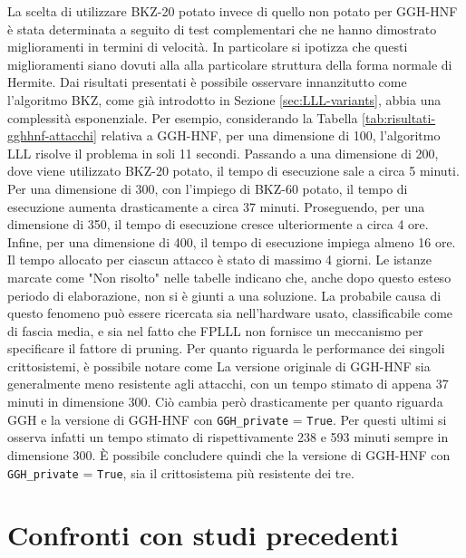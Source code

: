 La scelta di utilizzare BKZ-20 potato invece di quello non potato per GGH-HNF è stata 
determinata a seguito di test complementari che ne hanno dimostrato miglioramenti in 
termini di velocità. In particolare si ipotizza che questi miglioramenti siano dovuti
alla alla particolare struttura della forma normale di Hermite.
Dai risultati presentati è possibile osservare innanzitutto come l'algoritmo BKZ,
come già introdotto in Sezione \ref{sec:LLL-variants}, abbia una complessità esponenziale.
Per esempio, considerando la Tabella \ref{tab:risultati-gghhnf-attacchi} relativa a GGH-HNF, 
per una dimensione di 100, l'algoritmo 
LLL risolve il problema in 
soli 11 secondi. Passando a una dimensione di 200, dove viene utilizzato 
BKZ-20 potato, il tempo di esecuzione sale a circa 5 minuti. Per una dimensione di 300, 
con l'impiego di BKZ-60 potato, il tempo di esecuzione aumenta drasticamente a circa 37 minuti. 
Proseguendo, per una dimensione di 350, il tempo di esecuzione cresce ulteriormente a circa 
4 ore. Infine, per una dimensione di 400, il tempo di esecuzione impiega almeno 16 ore.
Il tempo allocato per ciascun attacco è stato di massimo 4 giorni.
Le istanze marcate come "Non risolto" nelle tabelle 
indicano che, anche dopo questo esteso periodo di elaborazione, non si è giunti a una soluzione. 
La probabile causa di questo fenomeno può essere ricercata sia nell'hardware usato, classificabile
come di fascia media, e sia nel fatto che FPLLL non fornisce un meccanismo per specificare 
il fattore di pruning.
Per quanto riguarda le performance dei singoli crittosistemi, è possibile notare come La
versione originale di GGH-HNF sia generalmente meno resistente agli attacchi, con un tempo stimato di 
appena 37 minuti in dimensione 300. Ciò cambia però drasticamente per quanto riguarda
GGH e la versione di GGH-HNF con \texttt{GGH\_private} = \texttt{True}. Per questi ultimi
si osserva infatti un tempo stimato di rispettivamente 238 e 593 minuti sempre in dimensione
300. È possibile concludere quindi che la versione di GGH-HNF con 
\texttt{GGH\_private} = \texttt{True}, sia il crittosistema più resistente dei tre. 

\section{Confronti con studi precedenti}

